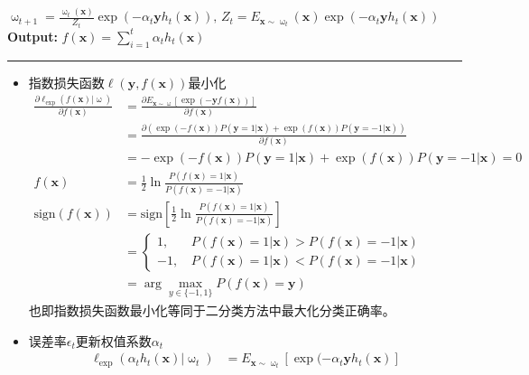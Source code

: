 \documentclass[a4paper]{article}
\begin{document}
							\hspace*{48pt} 	$\upomega_{t+1} = \frac{\upomega_t(\textbf{x})}{Z_t}\exp\left(-\alpha_t\textbf{y}h_t(\textbf{x})\right),
													\, Z_t = E_{\textbf{x}\sim \upomega_t}(\textbf{x})\exp(-\alpha_t\textbf{y}h_t(\textbf{x}))$\\
			\textbf{Output:} $f(\textbf{x}) = \sum_{i=1}^{t}\alpha_th_t(\textbf{x})$\\
			\noindent\rule[0.25\baselineskip]{\textwidth}{0.75pt}
			\begin{itemize}
				\item 指数损失函数$\ell(\mathbf{y}, f(\textbf{x}))$最小化
					\begin{align*}
						\frac{\partial \ell_{\exp}(f(\textbf{x})|\upomega)}{\partial f(\textbf{x})}
							& = \frac{\partial E_{\textbf{x}\sim\upomega}[\exp(-\textbf{y} f(\textbf{x}))]}{\partial f(\textbf{x})}\\
							& = \frac{\partial \left(\exp(-f(\textbf{x}))P(\textbf{y}=1|\textbf{x})+
													\exp(f(\textbf{x}))P(\textbf{y}=-1|\textbf{x})\right)}{\partial f(\textbf{x})}\\
							& = -\exp(-f(\textbf{x}))P(\textbf{y}=1|\textbf{x})+\exp(f(\textbf{x}))P(\textbf{y}=-1|\textbf{x})=0\\
						f(\textbf{x}) 
							& = \frac{1}{2}\ln\frac{P\left(f(\textbf{x})=1|\textbf{x}\right)}{P\left(f(\textbf{x})=-1|\textbf{x}\right)}\\
						\text{sign}(f(\textbf{x})) 
							& = \text{sign}\left[\frac{1}{2}\ln\frac{P\left(f(\textbf{x})=1|\textbf{x}\right)}{P\left(f(\textbf{x})=-1|\textbf{x}\right)}\right] \\
							& = \left \{\begin{array}{ll}
											1,\, &P(f(\textbf{x})=1|\textbf{x}) > P(f(\textbf{x})=-1|\textbf{x})\\
										   -1,\, &P(f(\textbf{x})=1|\textbf{x}) < P(f(\textbf{x})=-1|\textbf{x})
										\end{array} \right.\\
							& = \arg \max_{y\in \{-1,1\}} P(f(\textbf{x})=\mathbf{y})
						\end{align*}
				也即指数损失函数最小化等同于二分类方法中最大化分类正确率。
				\item 误差率$\epsilon_t$更新权值系数$\alpha_t$
					\begin{align*}
						\ell_{\exp}(\alpha_t h_t(\textbf{x})|\upomega_t) 
							& = E_{\textbf{x}\sim\upomega_t}[\exp(-\alpha_t\textbf{y}h_t(\textbf{x})] \\

\end{align*}
\end{itemize}
\end{document}
